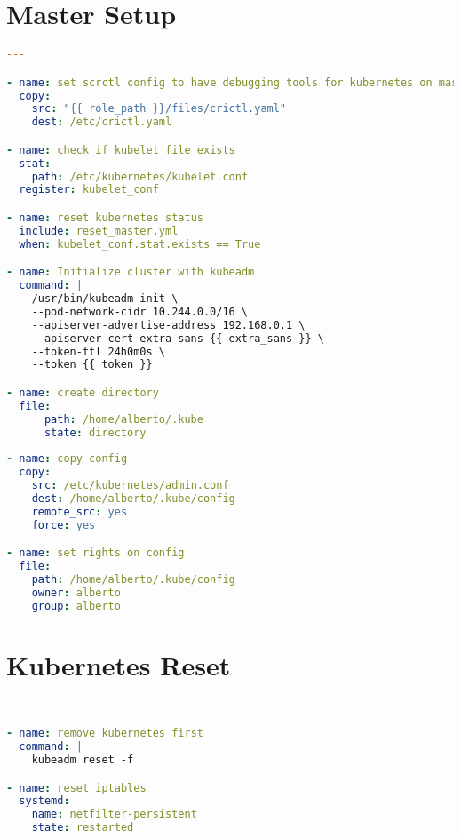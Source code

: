 \section{Master Setup}
\hfill \newline
\label{app:master_setup}
\begin{lstlisting}[language=yaml]
---

- name: set scrctl config to have debugging tools for kubernetes on master
  copy:
    src: "{{ role_path }}/files/crictl.yaml"
    dest: /etc/crictl.yaml

- name: check if kubelet file exists
  stat: 
    path: /etc/kubernetes/kubelet.conf
  register: kubelet_conf

- name: reset kubernetes status
  include: reset_master.yml
  when: kubelet_conf.stat.exists == True

- name: Initialize cluster with kubeadm
  command: |
    /usr/bin/kubeadm init \
    --pod-network-cidr 10.244.0.0/16 \
    --apiserver-advertise-address 192.168.0.1 \
    --apiserver-cert-extra-sans {{ extra_sans }} \
    --token-ttl 24h0m0s \
    --token {{ token }}

- name: create directory
  file:
      path: /home/alberto/.kube 
      state: directory 
    
- name: copy config
  copy:
    src: /etc/kubernetes/admin.conf
    dest: /home/alberto/.kube/config
    remote_src: yes
    force: yes

- name: set rights on config
  file:
    path: /home/alberto/.kube/config
    owner: alberto
    group: alberto
\end{lstlisting}

\section{Kubernetes Reset}
\hfill \newline
\label{app:reset}
\begin{lstlisting}[language=yaml]
---

- name: remove kubernetes first
  command: |
    kubeadm reset -f

- name: reset iptables
  systemd:
    name: netfilter-persistent
    state: restarted
\end{lstlisting}


